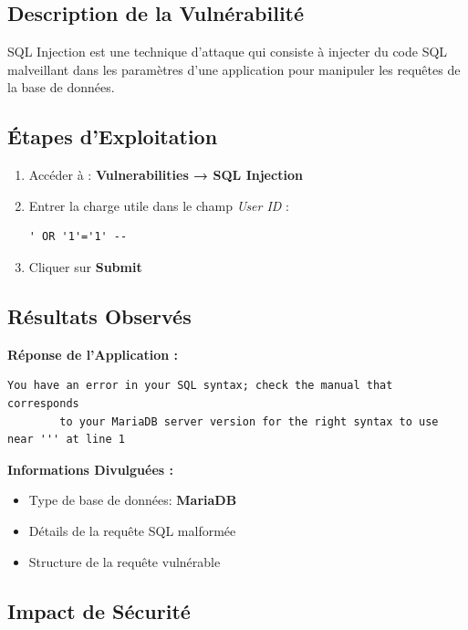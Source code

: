 \documentclass[12pt,a4paper,openany]{report}
\begin{document}
	\subsection{Description de la Vulnérabilité}
	
	SQL Injection est une technique d'attaque qui consiste à injecter du code SQL malveillant 
	dans les paramètres d'une application pour manipuler les requêtes de la base de données.
	
	\subsection{Étapes d'Exploitation}
	
	\begin{enumerate}
		\item Accéder à : \textbf{Vulnerabilities → SQL Injection}
		\item Entrer la charge utile dans le champ \textit{User ID} :
		\begin{lstlisting}[caption=Payload SQL Injection,numbers=none,frame=none,backgroundcolor={},rulecolor={}]
			' OR '1'='1' --
		\end{lstlisting}
		\item Cliquer sur \textbf{Submit}
	\end{enumerate}
	
	\subsection{Résultats Observés}
	
	\textbf{Réponse de l'Application :}
	\begin{lstlisting}[caption=Message d'erreur révélateur]
		You have an error in your SQL syntax; check the manual that corresponds 
		to your MariaDB server version for the right syntax to use near ''' at line 1
	\end{lstlisting}
	
	\textbf{Informations Divulguées :}
	\begin{itemize}
		\item Type de base de données: \textbf{MariaDB}
		\item Détails de la requête SQL malformée
		\item Structure de la requête vulnérable
	\end{itemize}
	
	\subsection{Impact de Sécurité}
	
\end{document}
